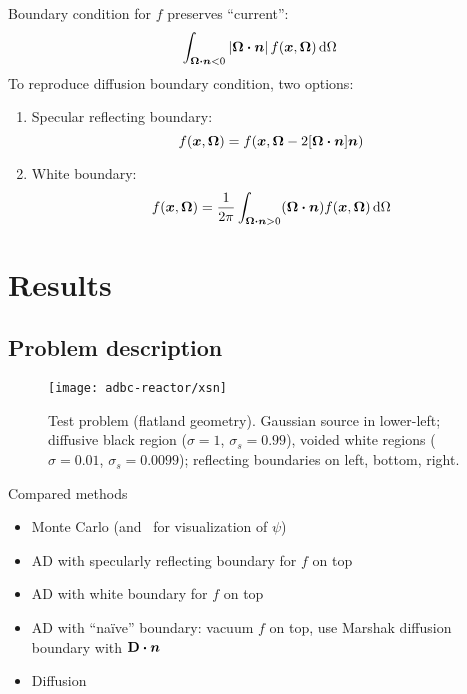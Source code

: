\documentclass{beamer}
\begin{document}
\begin{frame}
  Boundary condition for $f$ preserves ``current'':
  \begin{align*}
  \int_{\bm{\Omega}\bm{\cdot}\bm{n} < 0} \left| \bm{\Omega}\bm{\cdot} \bm{n} \right|
  f(\bm{x}, \bm{\Omega}) \mathop{}\!\mathrm{d}\Omega
  \end{align*}
 To reproduce diffusion boundary condition, two options:
 \begin{enumerate}
   \item Specular reflecting boundary:
     \begin{equation*}
       f(\bm{x}, \bm{\Omega}) = f(\bm{x},\bm{\Omega} - 2[\bm{\Omega} \bm{\cdot}
         \bm{n}] \bm{n}) 
     \end{equation*}
   \item White boundary:
     \begin{equation*}
       f(\bm{x}, \bm{\Omega}) = \frac{1}{2\pi} \int_{\bm{\Omega}\bm{\cdot}\bm{n} >
     0} (\bm{\Omega}\bm{\cdot} \bm{n}) f(\bm{x}, \bm{\Omega}) \mathop{}\!\mathrm{d}\Omega
     \end{equation*}
 \end{enumerate}
\end{frame}

\section{Results}

\subsection{Problem description}
\begin{frame}
\begin{figure}[tb]
  \texttt{[image: adbc-reactor/xsn]}

  \caption{Test problem (flatland geometry). Gaussian source in lower-left;
  diffusive black region ($\sigma=1$, $\sigma_s=0.99$), voided white regions
  ($\sigma=0.01$, $\sigma_s=0.0099$); reflecting boundaries on left, bottom,
  right.}
  \label{fig:problem}
\end{figure}
\end{frame}
  
\begin{frame}{Compared methods}
  \begin{itemize}
    \item Monte Carlo (and \SN\ for visualization of $\psi$)
    \item AD with specularly reflecting boundary for $f$ on top
    \item AD with white boundary for $f$ on top
    \item AD with ``na\"ive'' boundary: vacuum $f$ on top, use Marshak diffusion
      boundary with $\mathbf{D} \bm{\cdot} \bm{n}$
    \item Diffusion
  \end{itemize}
\end{frame}
\end{document}
